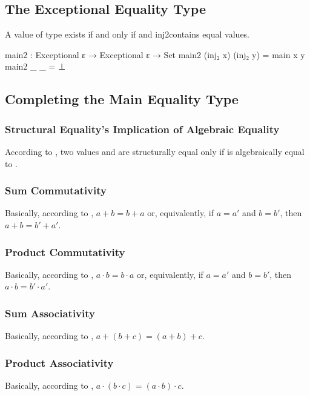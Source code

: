 \documentclass{report}
\begin{document}
\subsection{The Exceptional Equality Type}
A value of type    exists if and only if  and  \glspl{inj2contain} equal values.

\begin{code}
    main2 : Exceptional ε → Exceptional ε → Set
    main2 (inj₂ x) (inj₂ y) = main x y
    main2 _ _ = ⊥
\end{code}

\subsection{Completing the Main Equality Type}

\subsubsection{Structural Equality's Implication of Algebraic Equality}
According to , two  values  and  are structurally equal only if  is algebraically equal to .

\subsubsection{Sum Commutativity}
Basically, according to , \(a + b = b + a\) or, equivalently, if \(a = a\prime\) and \(b = b\prime\), then \(a + b = b\prime + a\prime\).

\subsubsection{Product Commutativity}
Basically, according to , \(a \cdot b = b \cdot a\) or, equivalently, if \(a = a\prime\) and \(b = b\prime\), then \(a \cdot b = b\prime \cdot a\prime\).

\subsubsection{Sum Associativity}
Basically, according to , \(a + \left(b + c\right) = \left(a + b\right) + c\).

\subsubsection{Product Associativity}
Basically, according to , \(a \cdot \left(b \cdot c\right) = \left(a \cdot b\right) \cdot c\).
\end{document}
